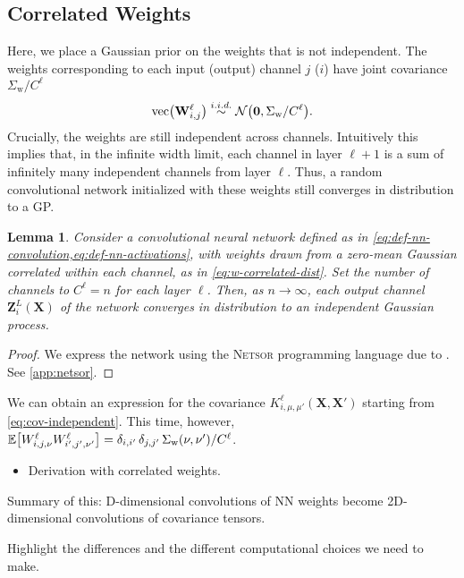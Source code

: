 \documentclass{article}
\newtheorem{lemma}[theorem]{Lemma}
\theoremstyle{definition}
\newcommand{\vX}{\mathbf{X}}
\newcommand{\vW}{\mathbf{W}}
\newcommand{\vZ}{\mathbf{Z}}
\newcommand{\vecfun}{\text{vec}\bra}
\newcommand{\simiid}{\overset{i.i.d.}{\sim}}
\newcommand{\bracket}[3]{{\left#1 #3 \right#2}}
\newcommand{\bra}{\bracket{(}{)}}
\newcommand{\sqb}{\bracket{[}{]}}
\newcommand{\ssup}[1]{^{#1}}
\begin{document}
\subsection{Correlated Weights}
Here, we place a Gaussian prior on the weights that is not independent. The weights
corresponding to each input (output) channel $j$ ($i$) have joint covariance
$\Sigma_\text{w}/C\ssup{\ell}$
\begin{equation}
  \vecfun{\vW\ssup{\ell}_{i,j}} \simiid \NormDist{\boldsymbol{0}, \Sigma_\text{w}/C\ssup{\ell}}.
  \label{eq:w-correlated-dist}
\end{equation}
Crucially, the weights are still independent across channels. Intuitively this
implies that, in the infinite width limit, each channel in layer $\ell+1$ is a
sum of infinitely many independent channels from layer $\ell$. Thus, a random
convolutional network initialized with these weights still converges in distribution
to a GP.

\begin{lemma}
  Consider a convolutional neural network defined as in
  \cref{eq:def-nn-convolution,eq:def-nn-activations}, with weights drawn from a
  zero-mean Gaussian correlated within each channel, as in \cref{eq:w-correlated-dist}.
  Set the number of channels to $C\ssup{\ell} = n$ for each layer $\ell$. Then,
  as $n\to \infty$, each output channel $\vZ\ssup{L}_i(\vX)$ of the network converges in
  distribution to an independent Gaussian process.
\end{lemma}
\begin{proof}
  We express the network using the \textsc{Netsor} programming language due to
  \citet{yang2019wide}. See \cref{app:netsor}.
\end{proof}

We can obtain an expression for the covariance $K\ssup{\ell}_{i,\mu,\mu'}(\vX,
\vX')$ starting from \cref{eq:cov-independent}. This time, however,
$\ExpSymb\sqb{W\ssup{\ell}_{i,j,\nu}W\ssup{\ell}_{i',j',\nu'}} = \delta_{i,i'} \, \delta_{j, j'} \, \Sigma_{\text{w}}\bra{\nu,\nu'}/C\ssup{\ell}$.

  
\begin{itemize}
    \item Derivation with correlated weights.
\end{itemize}
Summary of this: D-dimensional convolutions of NN weights become 2D-dimensional convolutions of covariance tensors. 

Highlight the differences and the different computational choices we need to make.
\end{document}

